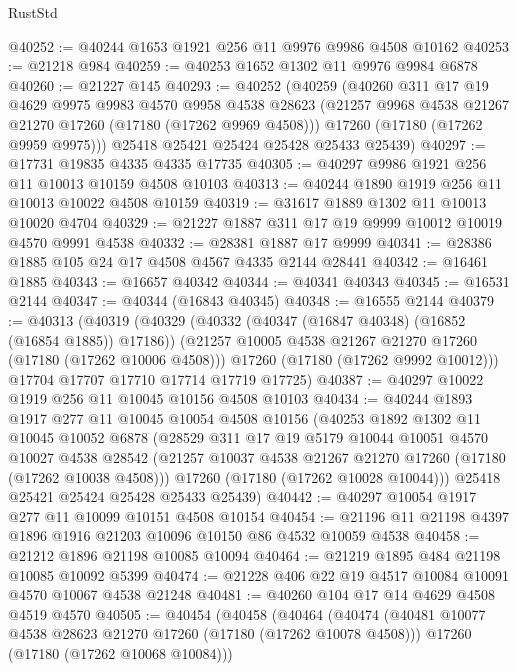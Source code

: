 \begin{lexlean}{RustStd}
\begin{coremodule}
{\begin{coremodule}
{{{{{{{{{{{{{{{{{{{{{{{{{{{{{{{{{{{{{{{{{{{{{{{{{{{{{{{@40252 := @40244 @1653 @1921 @256 @11 @9976 @9986 @4508 @10162
@40253 := @21218 @984
@40259 := @40253 @1652 @1302 @11 @9976 @9984 @6878
@40260 := @21227 @145
@40293 := @40252
    (@40259
      (@40260
        @311
        @17
        @19
        @4629
        @9975
        @9983
        @4570
        @9958
        @4538
        @28623
        (@21257 @9968 @4538 @21267 @21270 @17260 (@17180 (@17262 @9969 @4508)))
        @17260
        (@17180 (@17262 @9959 @9975)))
      @25418
      @25421
      @25424
      @25428
      @25433
      @25439)
@40297 := @17731 @19835 @4335 @4335 @17735
@40305 := @40297 @9986 @1921 @256 @11 @10013 @10159 @4508 @10103
@40313 := @40244 @1890 @1919 @256 @11 @10013 @10022 @4508 @10159
@40319 := @31617 @1889 @1302 @11 @10013 @10020 @4704
@40329 := @21227 @1887 @311 @17 @19 @9999 @10012 @10019 @4570 @9991 @4538
@40332 := @28381 @1887 @17 @9999
@40341 := @28386 @1885 @105 @24 @17 @4508 @4567 @4335 @2144 @28441
@40342 := @16461 @1885
@40343 := @16657 @40342
@40344 := @40341 @40343
@40345 := @16531 @2144
@40347 := @40344 (@16843 @40345)
@40348 := @16555 @2144
@40379 := @40313
    (@40319
      (@40329
        (@40332 (@40347 (@16847 @40348) (@16852 (@16854 @1885)) @17186))
        (@21257 @10005 @4538 @21267 @21270 @17260 (@17180 (@17262 @10006 @4508)))
        @17260
        (@17180 (@17262 @9992 @10012)))
      @17704
      @17707
      @17710
      @17714
      @17719
      @17725)
@40387 := @40297 @10022 @1919 @256 @11 @10045 @10156 @4508 @10103
@40434 := @40244
    @1893
    @1917
    @277
    @11
    @10045
    @10054
    @4508
    @10156
    (@40253
      @1892
      @1302
      @11
      @10045
      @10052
      @6878
      (@28529
        @311
        @17
        @19
        @5179
        @10044
        @10051
        @4570
        @10027
        @4538
        @28542
        (@21257 @10037 @4538 @21267 @21270 @17260 (@17180 (@17262 @10038 @4508)))
        @17260
        (@17180 (@17262 @10028 @10044)))
      @25418
      @25421
      @25424
      @25428
      @25433
      @25439)
@40442 := @40297 @10054 @1917 @277 @11 @10099 @10151 @4508 @10154
@40454 := @21196 @11 @21198 @4397 @1896 @1916 @21203 @10096 @10150 @86 @4532 @10059 @4538
@40458 := @21212 @1896 @21198 @10085 @10094
@40464 := @21219 @1895 @484 @21198 @10085 @10092 @5399
@40474 := @21228 @406 @22 @19 @4517 @10084 @10091 @4570 @10067 @4538 @21248
@40481 := @40260 @104 @17 @14 @4629 @4508 @4519 @4570
@40505 := @40454
    (@40458
      (@40464
        (@40474
          (@40481 @10077 @4538 @28623 @21270 @17260 (@17180 (@17262 @10078 @4508)))
          @17260
          (@17180 (@17262 @10068 @10084)))
}}}}}}}}}}}}}}}}}}}}}}}}}}}}}}}}}}}}}}}}}}}}}}}}}}}}}}}
\end{coremodule}}
\end{coremodule}
\end{lexlean}
